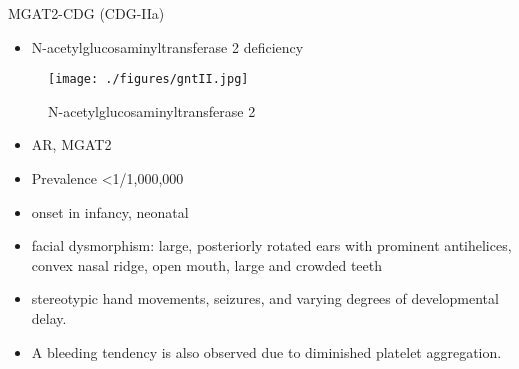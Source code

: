\documentclass[presentation, smaller]{beamer}
\begin{document}
\begin{frame}[label={sec:orge33fdc6}]{MGAT2-CDG (CDG-IIa)}
\begin{itemize}
\item N-acetylglucosaminyltransferase 2 deficiency
\end{itemize}

\begin{figure}[htbp]
\centering
\texttt{[image: ./figures/gntII.jpg]}
\caption{\label{fig:org5422be8}
N-acetylglucosaminyltransferase 2}
\end{figure}

\begin{itemize}
\item AR, MGAT2
\item Prevalence \textless{}1/1,000,000
\item onset in infancy, neonatal
\item facial dysmorphism: large, posteriorly rotated ears with prominent
antihelices, convex nasal ridge, open mouth, large and crowded
teeth
\item stereotypic hand movements, seizures, and varying degrees of
developmental delay.
\item A bleeding tendency is also observed due to diminished platelet
aggregation.
\end{itemize}
\end{frame}
\end{document}
